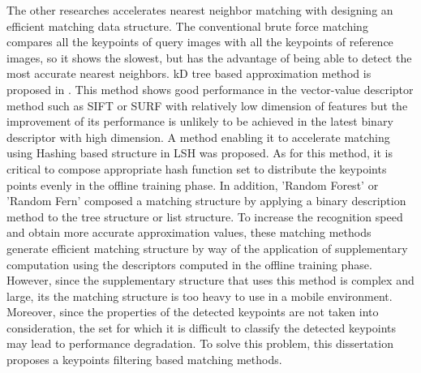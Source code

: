 The other researches accelerates nearest neighbor matching with designing an efficient matching data structure. The conventional brute force matching compares all the keypoints of query images with all the keypoints of reference images, so it shows the slowest, but has the advantage of being able to detect the most accurate nearest neighbors. kD tree based approximation method is proposed in \cite{beis_shape_1997}. This method shows good performance in the vector-value descriptor method such as SIFT or SURF with relatively low dimension of features but the improvement of its performance is unlikely to be achieved in the latest binary descriptor with high dimension. A method enabling it to accelerate matching using Hashing based structure in LSH\cite{gionis_similarity_1999} was proposed\cite{rublee_orb:_2011}. As for this method, it is critical to compose appropriate hash function set to distribute the keypoints points evenly in the offline training phase. In addition, 'Random Forest\cite{lepetit_keypoint_2006}' or 'Random Fern\cite{ozuysal_fast_2010}' composed a matching structure by applying a binary description method to the tree structure or list structure. To increase the recognition speed and obtain more accurate approximation values, these matching methods generate efficient matching structure by way of the application of supplementary computation using the descriptors computed in the offline training phase. However, since the supplementary structure that uses this method is complex and large, its the matching structure is too heavy to use in a mobile environment. Moreover, since the properties of the detected keypoints are not taken into consideration, the set for which it is difficult to classify the detected keypoints may lead to performance degradation. To solve this problem, this dissertation proposes a keypoints filtering based matching methods.  
